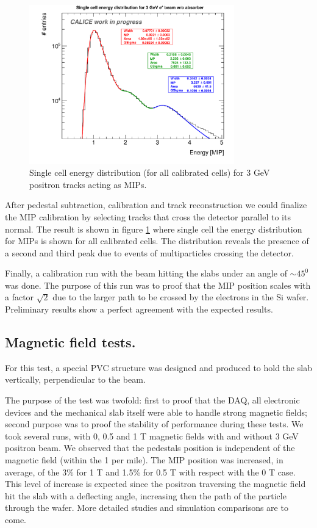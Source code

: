 \documentclass[journal]{IEEEtran}
\begin{document}
\begin{figure}[!t]
\centering
\includegraphics[width=3.5in]{mip3peaks-eps-converted-to.pdf}
\caption{Single cell energy distribution (for all calibrated cells) for 3 GeV positron tracks acting as MIPs. }
\label{miplog}
\end{figure}

After pedestal subtraction, calibration and track reconstruction we could finalize the MIP calibration by selecting tracks that cross the detector parallel to its normal.
The result is shown in figure \ref{miplog} where single cell the energy distribution for MIPs is shown for all calibrated cells.
The distribution reveals the presence of a second and third peak due to events of multiparticles crossing the detector.

Finally, a calibration run with the beam hitting the slabs under an angle of $\sim 45^{0}$ was done.
The purpose of this run was to proof that the MIP position scales with a factor $\sqrt{2}$
due to the larger path to be crossed by the electrons in the Si wafer.
Preliminary results show a perfect agreement with the expected results.


\subsection{Magnetic field tests.}

For this test, a special PVC structure was
designed and produced to hold the slab vertically, perpendicular to the beam.

The purpose of the test was twofold: first to proof that the DAQ, all electronic devices and the mechanical slab itself were able
to handle strong magnetic fields; second purpose was to proof the stability of performance during these tests.
We took several runs, with 0, 0.5 and 1 T magnetic fields with and without 3 GeV positron beam.
We observed that the pedestals position is independent of the magnetic field (within the 1 per mile). The MIP position was increased, in average,
of the 3\% for 1 T and 1.5\% for 0.5 T with respect with the 0 T case.
This level of increase is expected since the positron traversing the magnetic field hit the slab with a deflecting angle,
increasing then the path of the particle through the wafer. More detailed studies and simulation comparisons are to come.
\end{document}
